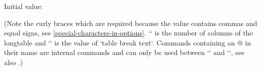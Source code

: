   Initial value:


  (Note the curly braces which are required because the value contains commas and equal signs, see \cref{special-characters-in-options}.
   `\the\LT@cols` is the number of columns of the longtable and `\object@tableBreakText` is the value of `table break text`.
   Commands containing an @ in their name are internal commands and can only be used between `\makeatletter` and `\makeatother`, see also \autocite{texexchange_make_at}.)

\bigpar

